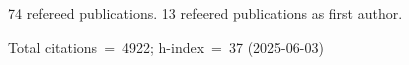 74 refereed publications. 13 refeered publications as first author.

Total citations~=~4922; h-index~=~37 (2025-06-03)
